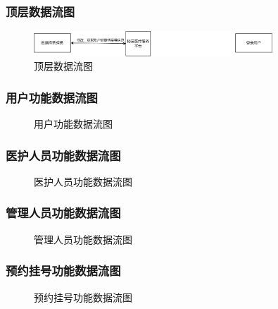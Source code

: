 \documentclass{article}
\begin{document}
\subsubsection{顶层数据流图}

\begin{figure}[H]
    \centering
    \includegraphics[width=0.8\textwidth]{images/all_dataflow.png}
    \caption{顶层数据流图}
\end{figure}

\subsubsection{用户功能数据流图}

\begin{figure}[H]
    \centering
    \caption{用户功能数据流图}
\end{figure}

\subsubsection{医护人员功能数据流图}

\begin{figure}[H]
    \centering
    \caption{医护人员功能数据流图}
\end{figure}

\subsubsection{管理人员功能数据流图}

\begin{figure}[H]
    \centering
    \caption{管理人员功能数据流图}
\end{figure}

\subsubsection{预约挂号功能数据流图}

\begin{figure}[H]
    \centering
    \caption{预约挂号功能数据流图}
\end{figure}
\end{document}

